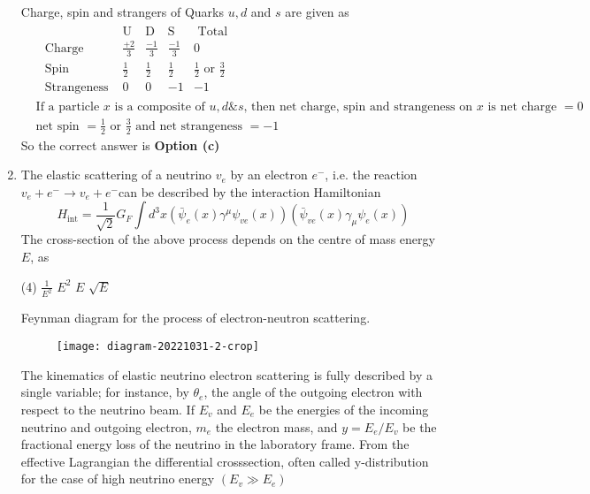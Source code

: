 \begin{enumerate}
	\begin{answer}
		Charge, spin and strangers of Quarks $u,d$ and $s$ are given as
		\begin{align*}
		&\begin{array}{ccccc} 
		& \mathrm{U} & \mathrm{D} & \mathrm{S} & \text { Total } \\
		\text { Charge } & \frac{+2}{3} & \frac{-1}{3} & \frac{-1}{3} & 0\\
		\text { Spin } & \frac{1}{2} & \frac{1}{2} & \frac{1}{2} & \frac{1}{2} \text { or } \frac{3}{2} \\
		\text { Strangeness } & 0 & 0 & -1 & -1
		\end{array}\\
		&\text{If a particle $x$ is a composite of $u, d \& s$, then net charge, spin and strangeness on $x$ is net charge $=0$}\\
		&\text{net spin $=\frac{1}{2}$ or $\frac{3}{2}$ and net strangeness $=-1$}
		\end{align*}
		So the correct answer is \textbf{Option (c)}
	\end{answer}
	\item  The elastic scattering of a neutrino $v_e$ by an electron $e^{-}$, i.e. the reaction $v_e+e^{-} \rightarrow v_e+e^{-}$can be described by the interaction Hamiltonian
	$$
	H_{\mathrm{int}}=\frac{1}{\sqrt{2}} G_F \int d^3 x\left(\bar{\psi}_e(x) \gamma^\mu \psi_{v e}(x)\right)\left(\bar{\psi}_{v e}(x) \gamma_\mu \psi_e(x)\right)
	$$
	The cross-section of the above process depends on the centre of mass energy $E$, as
	{}
	\begin{tasks}(4)
		\task[\textbf{a.}]$\frac{1}{E^2}$
		\task[\textbf{b.}]$E^2$
		\task[\textbf{c.}]$E$
		\task[\textbf{d.}] $\sqrt{E}$
	\end{tasks}
	\begin{answer}
		Feynman diagram for the process of electron-neutron scattering.\\
		\begin{figure}[H]
			\centering
			\texttt{[image: diagram-20221031-2-crop]}
		\end{figure}
		The kinematics of elastic neutrino electron scattering is fully described by a single variable; for instance, by $\theta_e$, the angle of the outgoing electron with respect to the neutrino beam. If $E_v$ and $E_e$ be the energies of the incoming neutrino and outgoing electron, $m_e$ the electron mass, and $y=E_e / E_v$ be the fractional energy loss of the neutrino in the laboratory frame. From the effective Lagrangian the differential crosssection, often called y-distribution for the case of high neutrino energy $\left(E_v \gg E_e\right)$

\end{answer}
\end{enumerate}

